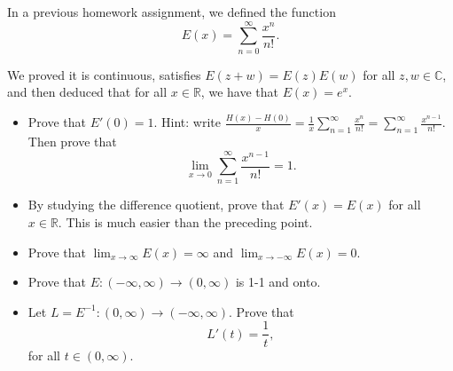   \begin{exercise}
    In a previous homework assignment, we defined the function
    \begin{equation}
      E(x) = \sum_{n=0}^{\infty} \frac{x^n}{n!}.
    \end{equation}
    
    We proved it is continuous, satisfies $E(z+w) = E(z)E(w)$ for all $z, w \in \mathbb{C}$, and then deduced that for all $x \in \mathbb{R}$, we have that $E(x) = e^x$.
    
    \begin{itemize}
      \item Prove that $E'(0) = 1$. Hint: write $\frac{H(x)-H(0)}{x} = \frac{1}{x} \sum_{n=1}^{\infty} \frac{x^n}{n!} = \sum_{n=1}^{\infty} \frac{x^{n-1}}{n!}$. Then prove that
      \begin{equation}
        \lim_{x\to 0} \sum_{n=1}^{\infty} \frac{x^{n-1}}{n!} = 1.
      \end{equation}
      
      \item By studying the difference quotient, prove that $E'(x) = E(x)$ for all $x \in \mathbb{R}$. This is much easier than the preceding point.
      
      \item Prove that $\lim_{x\to\infty} E(x) = \infty$ and $\lim_{x\to-\infty} E(x) = 0$.
      
      \item Prove that $E : (-\infty, \infty) \to (0, \infty)$ is 1-1 and onto.
      
      \item Let $L = E^{-1}: (0, \infty) \to (-\infty, \infty)$. Prove that
      \begin{equation}
        L'(t) = \frac{1}{t},
      \end{equation}
      for all $t \in (0, \infty)$.
    \end{itemize}
  \end{exercise}
  \begin{solution}

  \end{solution}

